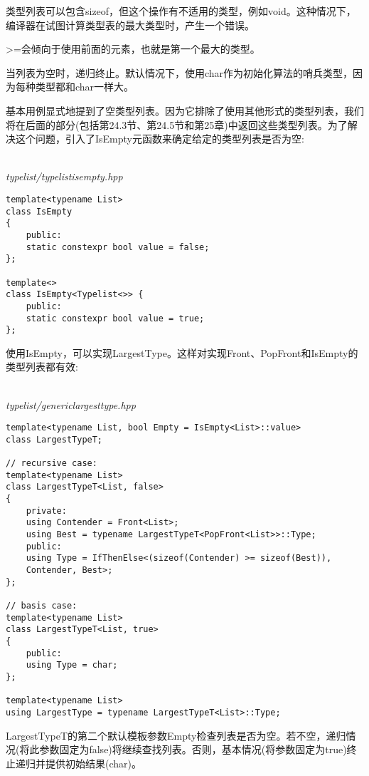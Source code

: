 \begin{tcolorbox}[colback=webgreen!5!white,colframe=webgreen!75!black]
\hspace*{0.75cm}类型列表可以包含sizeof，但这个操作有不适用的类型，例如void。这种情况下，编译器在试图计算类型表的最大类型时，产生一个错误。
\end{tcolorbox}

>=会倾向于使用前面的元素，也就是第一个最大的类型。

当列表为空时，递归终止。默认情况下，使用char作为初始化算法的哨兵类型，因为每种类型都和char一样大。

基本用例显式地提到了空类型列表。因为它排除了使用其他形式的类型列表，我们将在后面的部分(包括第24.3节、第24.5节和第25章)中返回这些类型列表。为了解决这个问题，引入了IsEmpty元函数来确定给定的类型列表是否为空:

\hspace*{\fill} \\ %
\noindent
\textit{typelist/typelistisempty.hpp}
\begin{lstlisting}[style=styleCXX]
template<typename List>
class IsEmpty
{
	public:
	static constexpr bool value = false;
};

template<>
class IsEmpty<Typelist<>> {
	public:
	static constexpr bool value = true;
};
\end{lstlisting}

使用IsEmpty，可以实现LargestType。这样对实现Front、PopFront和IsEmpty的类型列表都有效:

\hspace*{\fill} \\ %
\noindent
\textit{typelist/genericlargesttype.hpp}
\begin{lstlisting}[style=styleCXX]
template<typename List, bool Empty = IsEmpty<List>::value>
class LargestTypeT;

// recursive case:
template<typename List>
class LargestTypeT<List, false>
{
	private:
	using Contender = Front<List>;
	using Best = typename LargestTypeT<PopFront<List>>::Type;
	public:
	using Type = IfThenElse<(sizeof(Contender) >= sizeof(Best)),
	Contender, Best>;
};

// basis case:
template<typename List>
class LargestTypeT<List, true>
{
	public:
	using Type = char;
};

template<typename List>
using LargestType = typename LargestTypeT<List>::Type;
\end{lstlisting}

LargestTypeT的第二个默认模板参数Empty检查列表是否为空。若不空，递归情况(将此参数固定为false)将继续查找列表。否则，基本情况(将参数固定为true)终止递归并提供初始结果(char)。

